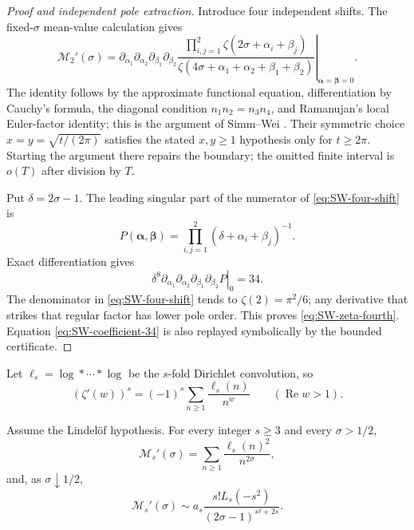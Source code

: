 \begin{proof}[Proof and independent pole extraction]
Introduce four independent shifts.  The fixed-$\sigma$ mean-value calculation gives
\begin{equation}
 \mathcal M_2'(\sigma)=\left.
 \partial_{\alpha_1}\partial_{\alpha_2}\partial_{\beta_1}\partial_{\beta_2}
 \frac{\prod_{i,j=1}^{2}\zeta(2\sigma+\alpha_i+\beta_j)}
 {\zeta(4\sigma+\alpha_1+\alpha_2+\beta_1+\beta_2)}
 \right|_{\boldsymbol\alpha=\boldsymbol\beta=0}.
 \label{eq:SW-four-shift}
\end{equation}
The identity follows by the approximate functional equation, differentiation by Cauchy's
formula, the diagonal condition $n_1n_2=n_3n_4$, and Ramanujan's local Euler-factor identity;
this is the argument of Simm--Wei \cite[Sec.~3]{simmWei2026}.  Their symmetric choice
$x=y=\sqrt{t/(2\pi)}$ satisfies the stated $x,y\geq1$ hypothesis only for $t\geq2\pi$.
Starting the argument there repairs the boundary; the omitted finite interval is $o(T)$ after
division by $T$.

Put $\delta=2\sigma-1$.  The leading singular part of the numerator of
\eqref{eq:SW-four-shift} is
\begin{equation}
 P(\boldsymbol\alpha,\boldsymbol\beta)
 =\prod_{i,j=1}^{2}(\delta+\alpha_i+\beta_j)^{-1}.
\end{equation}
Exact differentiation gives
\begin{equation}
 \left.\delta^8
 \partial_{\alpha_1}\partial_{\alpha_2}\partial_{\beta_1}\partial_{\beta_2}P
 \right|_0=34.
 \label{eq:SW-coefficient-34}
\end{equation}
The denominator in \eqref{eq:SW-four-shift} tends to
$\zeta(2)=\pi^2/6$; any derivative that strikes that regular factor has lower pole order.
This proves \eqref{eq:SW-zeta-fourth}.  Equation \eqref{eq:SW-coefficient-34} is also replayed
symbolically by the bounded certificate.
\end{proof}

Let $\ell_s=\log*\cdots*\log$ be the $s$-fold Dirichlet convolution, so
\begin{equation}
 (\zeta'(w))^s=(-1)^s\sum_{n\geq1}\frac{\ell_s(n)}{n^w}
 \qquad(\operatorname{Re}w>1).
 \label{eq:SW-log-convolution}
\end{equation}

\begin{theorem}
\label{thm:SW-zeta-general}
Assume the Lindel\"of hypothesis.  For every integer $s\geq3$ and every $\sigma>1/2$,
\begin{equation}
 \mathcal M_s'(\sigma)=\sum_{n\geq1}\frac{\ell_s(n)^2}{n^{2\sigma}},
 \label{eq:SW-mean-Dirichlet}
\end{equation}
and, as $\sigma\downarrow1/2$,
\begin{equation}
 \mathcal M_s'(\sigma)\sim
 a_s\frac{s!L_s(-s^2)}{(2\sigma-1)^{s^2+2s}}.
 \label{eq:SW-zeta-general}
\end{equation}
\end{theorem}

